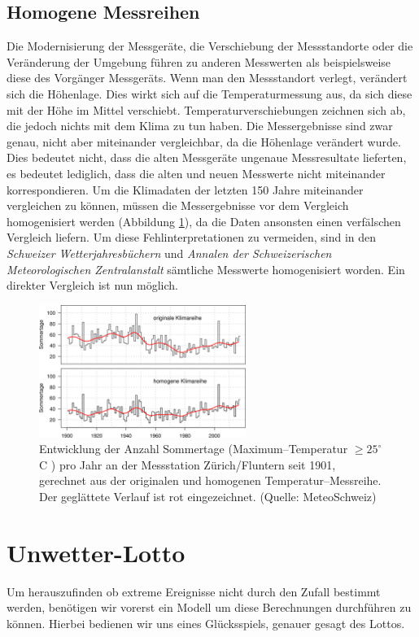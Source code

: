 \begin{refsection}
\subsection{Homogene Messreihen}
Die Modernisierung der Messgeräte, die Verschiebung der Messstandorte oder die Veränderung der Umgebung führen zu anderen Messwerten als beispielsweise diese des Vorgänger Messgeräts. Wenn man den Messstandort verlegt, verändert sich die Höhenlage. Dies wirkt sich auf die Temperaturmessung aus, da sich diese mit der Höhe im Mittel verschiebt. Temperaturverschiebungen zeichnen sich ab, die jedoch nichts mit dem Klima zu tun haben. Die Messergebnisse sind zwar genau, nicht aber miteinander vergleichbar, da die Höhenlage verändert wurde.
Dies bedeutet nicht, dass die alten Messgeräte ungenaue Messresultate lieferten, es bedeutet lediglich, dass die alten und neuen Messwerte nicht miteinander korrespondieren. 
Um die Klimadaten der letzten 150 Jahre miteinander vergleichen zu können, müssen die Messergebnisse vor dem Vergleich homogenisiert werden (Abbildung \ref{Homogen}), da die Daten ansonsten einen verfälschen Vergleich liefern.
Um diese Fehlinterpretationen zu vermeiden, sind in den \textit{Schweizer Wetterjahresbüchern} und \textit{Annalen der Schweizerischen Meteorologischen Zentralanstalt} sämtliche Messwerte homogenisiert worden. Ein direkter Vergleich ist nun möglich.

\begin{figure}
\centering
\includegraphics[width=0.6\textwidth]{extrem/Homogen.jpg}
\caption{Entwicklung der Anzahl Sommertage (Maximum--Temperatur $\ge 25^{\circ}$C ) pro Jahr an der Messstation Zürich/Fluntern seit 1901, gerechnet aus der originalen und homogenen Temperatur--Messreihe. Der geglättete Verlauf ist rot eingezeichnet. (Quelle: MeteoSchweiz)}
\label{Homogen}
\end{figure}


\section{Unwetter-Lotto}
Um herauszufinden ob extreme Ereignisse nicht durch den Zufall bestimmt werden, benötigen wir vorerst ein Modell um diese Berechnungen durchführen zu können.
Hierbei bedienen wir uns eines Glücksspiels, genauer gesagt des Lottos.


\end{refsection}
